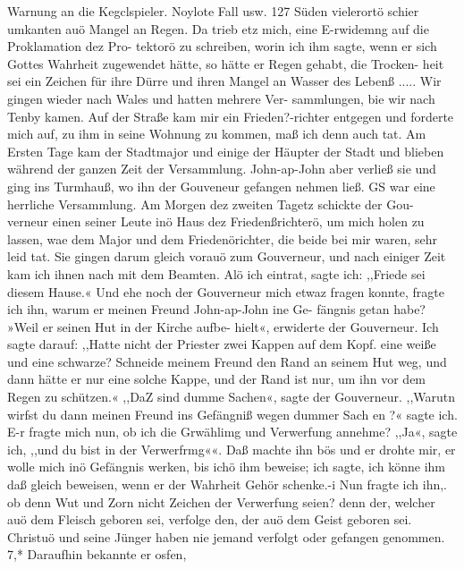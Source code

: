 Warnung an die Kegclspieler. Noylote Fall usw. 127
Süden vielerortö schier umkanten auö Mangel an Regen. Da
trieb etz mich, eine E-rwidemng auf die Proklamation dez Pro-
tektorö zu schreiben, worin ich ihm sagte, wenn er sich Gottes
Wahrheit zugewendet hätte, so hätte er Regen gehabt, die Trocken-
heit sei ein Zeichen für ihre Dürre und ihren Mangel an Wasser
des Lebenß .....
Wir gingen wieder nach Wales und hatten mehrere Ver-
sammlungen, bie wir nach Tenby kamen. Auf der Straße kam
mir ein Frieden?-richter entgegen und forderte mich auf, zu ihm
in seine Wohnung zu kommen, maß ich denn auch tat. Am
Ersten Tage kam der Stadtmajor und einige der Häupter der
Stadt und blieben während der ganzen Zeit der Versammlung.
John-ap-John aber verließ sie und ging ins Turmhauß, wo ihn
der Gouveneur gefangen nehmen ließ. GS war eine herrliche
Versammlung. Am Morgen dez zweiten Tagetz schickte der Gou-
verneur einen seiner Leute inö Haus dez Friedenßrichterö, um mich
holen zu lassen, wae dem Major und dem Friedenörichter, die
beide bei mir waren, sehr leid tat. Sie gingen darum gleich
vorauö zum Gouverneur, und nach einiger Zeit kam ich ihnen nach
mit dem Beamten. Alö ich eintrat, sagte ich: ,,Friede sei diesem
Hause.« Und ehe noch der Gouverneur mich etwaz fragen konnte,
fragte ich ihn, warum er meinen Freund John-ap-John ine Ge-
fängnis getan habe? »Weil er seinen Hut in der Kirche aufbe-
hielt«, erwiderte der Gouverneur. Ich sagte darauf: ,,Hatte nicht
der Priester zwei Kappen auf dem Kopf. eine weiße und eine
schwarze? Schneide meinem Freund den Rand an seinem Hut
weg, und dann hätte er nur eine solche Kappe, und der Rand
ist nur, um ihn vor dem Regen zu schützen.« ,,DaZ sind dumme
Sachen«, sagte der Gouverneur. ,,Warutn wirfst du dann meinen
Freund ins Gefängniß wegen dummer Sach en ?« sagte ich. E-r fragte
mich nun, ob ich die Grwählimg und Verwerfung annehme?
,,Ja«, sagte ich, ,,und du bist in der Verwerfrmg««. Daß machte
ihn bös und er drohte mir, er wolle mich inö Gefängnis werken,
bis ichö ihm beweise; ich sagte, ich könne ihm daß gleich beweisen,
wenn er der Wahrheit Gehör schenke.-i Nun fragte ich ihn,. ob denn
Wut und Zorn nicht Zeichen der Verwerfung seien? denn der,
welcher auö dem Fleisch geboren sei, verfolge den, der auö dem
Geist geboren sei. Christuö und seine Jünger haben nie jemand
verfolgt oder gefangen genommen. 7,* Daraufhin bekannte er osfen,


